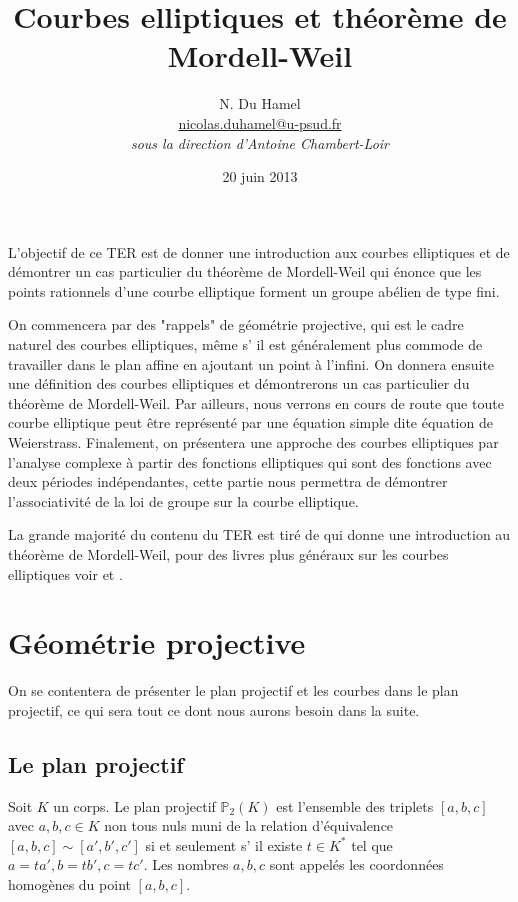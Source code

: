\documentclass{article}
\begin{document}
\title{Courbes elliptiques et théorème de Mordell-Weil}
\date{20 juin 2013}
\author{N. Du Hamel  \\ \href{mailto:nicolas.duhamel@u-psud.fr}{nicolas.duhamel@u-psud.fr} \\
\emph{sous la direction d'Antoine Chambert-Loir}}
\maketitle


L'objectif de ce TER est de donner une introduction aux courbes elliptiques et de démontrer un cas
particulier du théorème de Mordell-Weil qui énonce que les points rationnels d'une courbe elliptique
forment un groupe abélien de type fini.

On commencera par des "rappels" de géométrie projective, qui est le cadre naturel des courbes elliptiques,
même s’ il est généralement plus commode de travailler dans le plan affine en ajoutant un point à l'infini.
On donnera ensuite une définition des courbes elliptiques et démontrerons un cas particulier du
théorème de Mordell-Weil.
Par ailleurs, nous verrons en cours de route que toute courbe elliptique peut être représenté par
une équation simple dite équation de Weierstrass.
Finalement, on présentera une approche des courbes elliptiques par l'analyse complexe à partir des
fonctions elliptiques qui sont des fonctions avec deux périodes indépendantes, cette partie nous permettra
de démontrer l'associativité de la loi de groupe sur la courbe elliptique.

La grande majorité du contenu du TER est tiré de \cite{silverman_rational_1992} qui donne une introduction au
théorème de Mordell-Weil, pour des livres plus généraux sur les courbes elliptiques voir
\cite{cassels_lectures_1991} et \cite{mckean_elliptic_1999}.

\section{Géométrie projective}
On se contentera de présenter le plan projectif et les courbes dans le plan projectif, ce qui sera
tout ce dont nous aurons besoin dans la suite.
\subsection{Le plan projectif}
Soit $K$ un corps. Le plan projectif $\mathbb{P}_{2}(K)$ est l'ensemble des triplets $[a,b,c]$ avec $a,b,c \in K$ non tous nuls
muni de la relation d'équivalence $[a,b,c] \sim [a',b',c']$ si et seulement s’ il existe 
$t\in K^{*}$ tel que $a=ta', b=tb', c=tc'$. Les nombres $a,b,c$ sont appelés les coordonnées homogènes
du point $[a,b,c]$.
\end{document}
